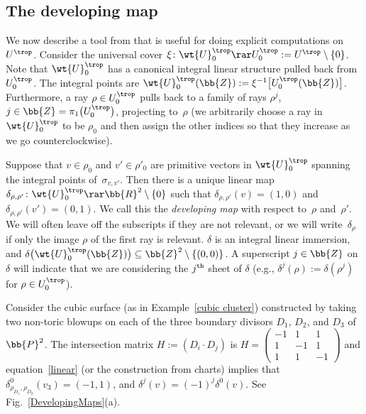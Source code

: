 \subsection{The developing map}\label{dev}

We now describe a tool from \cite{GHK1} that is useful for doing explicit computations on $U^{\trop}$. Consider the universal cover $\xi\colon \wt{U}_0^{\trop} \rar U^{\trop}_0:=U^{\trop}\setminus \{0\}$. Note that $\wt{U}_0^{\trop}$ has a canonical integral linear structure pulled back from~$U^{\trop}_0$. The integral points are $\wt{U}_0^{\trop}(\bb{Z}) := \xi^{-1}\big[U^{\trop}_0(\bb{Z})\big]$. Furthermore, a ray $\rho\in U^{\trop}_0$ pulls back to a family of rays $\rho^j$, $j\in \bb{Z}=\pi_1\big(U^{\trop}_0\big)$, projecting to~$\rho$ (we arbitrarily choose a ray in $\wt{U}_0^{\trop}$ to be $\rho_0$ and then assign the other indices so that they increase as we go counterclockwise).

Suppose that $v \in \rho_0$ and $v' \in \rho'_0$ are primitive vectors in $\wt{U}_0^{\trop}$ spanning the integral points of~$\sigma_{v,v'}$.
 Then there is a unique linear map $\delta_{\rho,\rho'}\colon \wt{U}_0^{\trop} \rar \bb{R}^2\setminus\{0\}$ such that $\delta_{\rho,\rho'}(v)=(1,0)$ and $\delta_{\rho,\rho'}(v')=(0,1)$. We call this the {\it developing map} with respect to~$\rho$ and~$\rho'$.
 We will often leave off the subscripts if they are not relevant, or we will write~$\delta_{\rho}$ if only
the image $\rho$ of the first ray is relevant. $\delta$ is an integral linear immersion, and $\delta\big(\wt{U}_0^{\trop}(\bb{Z})\big) \subseteq \bb{Z}^2\setminus \{(0,0)\}$. A superscript $j\in \bb{Z}$ on $\delta$ will indicate that we are considering the $j^{\tt{th}}$ sheet of $\delta$ (e.g., $\delta^j(\rho):=\delta(\rho^j)$ for $\rho\in U^{\trop}_0$).

\begin{eg} \label{cubicdevelop}
Consider the cubic surface (as in Example~\ref{cubic cluster}) constructed by taking two non-toric blowups on each of the three boundary divisors $D_1$, $D_2$, and $D_3$ of $\bb{P}^2$. The intersection matrix $H:=(D_i \cdot D_j)$ is $
H=	\left(\begin{smallmatrix}
		-1 &1 & 1 \\
		1 &-1 & 1 \\
		1 &1 & -1
		\end{smallmatrix}\right)
$
and equation~\eqref{linear} (or the construction from charts) implies that $\delta^0_{\rho_{D_1},\rho_{D_2}}(v_3) = (-1,1)$, and $\delta^j(v) = (-1)^j\delta^0(v)$. See Fig.~\ref{DevelopingMaps}(a).
\end{eg}


